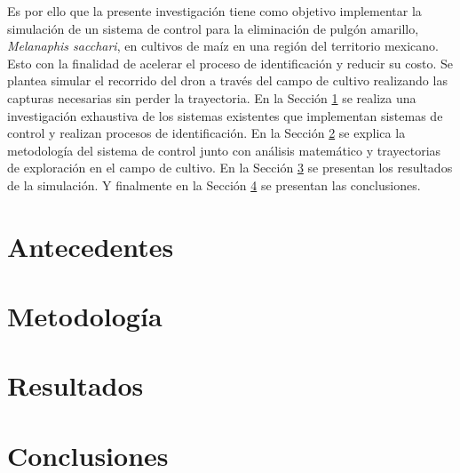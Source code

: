 \documentclass[11pt]{exam}
\begin{document}
    Es por ello que la presente investigaci\'on tiene como objetivo implementar la simulaci\'on de un sistema de control para la eliminaci\'on de pulg\'on amarillo, \textit{Melanaphis sacchari}, en cultivos de ma\'iz en una regi\'on del territorio mexicano. Esto con la finalidad de acelerar el proceso de identificaci\'on y reducir su costo. Se plantea simular el recorrido del dron a trav\'es del campo de cultivo realizando las capturas necesarias sin perder la trayectoria. En la Secci\'on \ref{sec2} se realiza una investigaci\'on exhaustiva de los sistemas existentes que implementan sistemas de control y realizan procesos de identificaci\'on. En la Secci\'on \ref{sec3} se explica la metodología del sistema de control junto con análisis matemático y trayectorias de exploración en el campo de cultivo. En la Secci\'on \ref{sec4} se presentan los resultados de la simulaci\'on. Y finalmente en la Secci\'on \ref{sec5} se presentan las conclusiones.

    \section{Antecedentes}\label{sec2}

    \section{Metodolog\'ia}\label{sec3}

    \section{Resultados}\label{sec4}

    \section{Conclusiones}\label{sec5}

    \printbibliography
\end{document}
